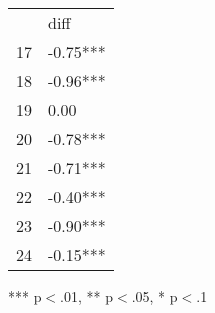 \documentclass{article}
\begin{document}
\begin{table}[!h]
\centering
\begin{tabular}{ll}
\cline{1-2}
\multicolumn{1}{|l}{} &
  \multicolumn{1}{|l|}{diff} \\
\cline{1-2}
\multicolumn{1}{|l}{17} &
  \multicolumn{1}{|l|}{-0.75***} \\
\cline{1-2}
\multicolumn{1}{|l}{18} &
  \multicolumn{1}{|l|}{-0.96***} \\
\cline{1-2}
\multicolumn{1}{|l}{19} &
  \multicolumn{1}{|l|}{0.00} \\
\cline{1-2}
\multicolumn{1}{|l}{20} &
  \multicolumn{1}{|l|}{-0.78***} \\
\cline{1-2}
\multicolumn{1}{|l}{21} &
  \multicolumn{1}{|l|}{-0.71***} \\
\cline{1-2}
\multicolumn{1}{|l}{22} &
  \multicolumn{1}{|l|}{-0.40***} \\
\cline{1-2}
\multicolumn{1}{|l}{23} &
  \multicolumn{1}{|l|}{-0.90***} \\
\cline{1-2}
\multicolumn{1}{|l}{24} &
  \multicolumn{1}{|l|}{-0.15***} \\
\cline{1-2}
\end{tabular}

\footnotesize{
*** p$<$.01, ** p$<$.05, * p$<$.1
}
\end{table}
\end{document}

